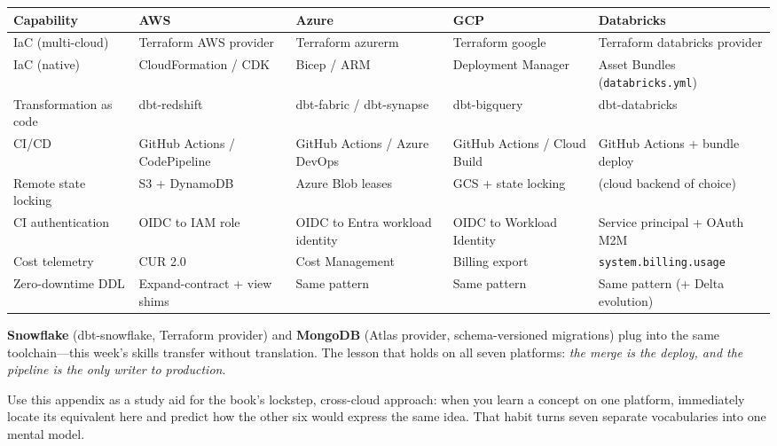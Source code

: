 \begin{center}
\footnotesize
\begin{tabular}{@{}p{2.4cm}p{2.9cm}p{2.9cm}p{2.9cm}p{2.9cm}@{}}
\toprule
\textbf{Capability} & \textbf{AWS} & \textbf{Azure} & \textbf{GCP} & \textbf{Databricks} \\
\midrule
IaC (multi-cloud) & Terraform AWS provider & Terraform azurerm & Terraform google & Terraform databricks provider \\
IaC (native) & CloudFormation / CDK & Bicep / ARM & Deployment Manager & Asset Bundles (\texttt{databricks.yml}) \\
Transformation as code & dbt-redshift & dbt-fabric / dbt-synapse & dbt-bigquery & dbt-databricks \\
CI/CD & GitHub Actions / CodePipeline & GitHub Actions / Azure DevOps & GitHub Actions / Cloud Build & GitHub Actions + bundle deploy \\
Remote state locking & S3 + DynamoDB & Azure Blob leases & GCS + state locking & (cloud backend of choice) \\
\addlinespace
CI authentication & OIDC to IAM role & OIDC to Entra workload identity & OIDC to Workload Identity & Service principal + OAuth M2M \\
Cost telemetry & CUR 2.0 & Cost Management & Billing export & \texttt{system.billing.usage} \\
Zero-downtime DDL & Expand-contract + view shims & Same pattern & Same pattern & Same pattern (+ Delta evolution) \\
\bottomrule
\end{tabular}
\end{center}

\noindent \textbf{Snowflake} (dbt-snowflake, Terraform provider) and \textbf{MongoDB} (Atlas
provider, schema-versioned migrations) plug into the same toolchain---this week's skills transfer
without translation. The lesson that holds on all seven platforms: \emph{the merge is the deploy,
and the pipeline is the only writer to production}.

\begin{tipbox}
Use this appendix as a study aid for the book's lockstep, cross-cloud approach: when you learn a
concept on one platform, immediately locate its equivalent here and predict how the other six
would express the same idea. That habit turns seven separate vocabularies into one mental model.
\end{tipbox}
